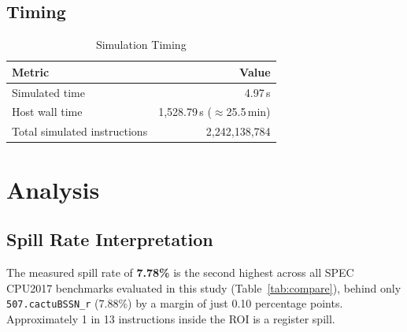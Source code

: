 \documentclass[conference]{IEEEtran}
\begin{document}
\subsection{Timing}

\begin{table}[H]
\centering
\caption{Simulation Timing}
\label{tab:timing}
\begin{tabular}{lr}
\toprule
\textbf{Metric} & \textbf{Value} \\
\midrule
Simulated time           & 4.97\,s \\
Host wall time           & 1{,}528.79\,s ($\approx$25.5\,min) \\
Total simulated instructions & 2,242,138,784 \\
\bottomrule
\end{tabular}
\end{table}

\section{Analysis}

\subsection{Spill Rate Interpretation}

The measured spill rate of \textbf{7.78\%} is the second highest
across all SPEC CPU2017 benchmarks evaluated in this study
(Table~\ref{tab:compare}), behind only \texttt{507.cactuBSSN\_r}
(7.88\%) by a margin of just 0.10 percentage points. Approximately
1 in 13 instructions inside the ROI is a register spill.
\end{document}
